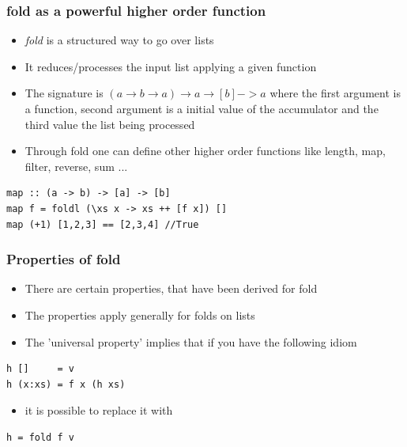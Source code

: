 \documentclass[10pt]{beamer}
\begin{document}
\begin{frame}[fragile]
\frametitle{fold as a powerful higher order function}
\begin{itemize}
\item \textit{fold} is a structured way to go over lists  	
\item It reduces/processes the input list applying a given function
\item The signature is $(a \rightarrow b \rightarrow a) \rightarrow  a \rightarrow  [b] -> a$ where the first argument is a
	function, second argument is a initial value of the accumulator and the third value the list being processed
\item Through fold one can define other higher order functions like length, map, filter, reverse, sum ...
\end{itemize}

\begin{lstlisting}
map :: (a -> b) -> [a] -> [b]
map f = foldl (\xs x -> xs ++ [f x]) [] 
map (+1) [1,2,3] == [2,3,4] //True
\end{lstlisting}

\end{frame}


\begin{frame}[fragile]
\frametitle{Properties of fold}
\begin{itemize}
\item There are certain properties, that have been derived for fold 
\item The properties apply generally for folds on lists 
\item The 'universal property' implies that if you have the following idiom   	
\end{itemize}

\begin{lstlisting}
h []     = v
h (x:xs) = f x (h xs)
\end{lstlisting}

\begin{itemize}
\item it is possible to replace it with
\end{itemize}

\begin{lstlisting}
h = fold f v
\end{lstlisting}

\end{frame}
\end{document}
